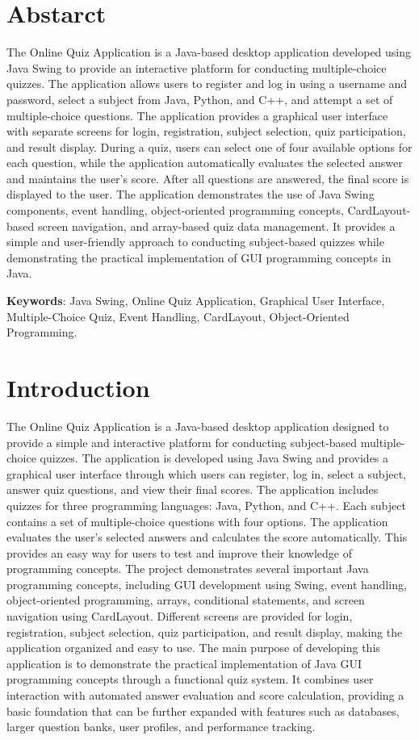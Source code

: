 \documentclass[11pt,a4paper]{report}  %
\begin{document}
\section*{Abstarct}
\noindent The Online Quiz Application is a Java-based desktop application developed using Java Swing to provide an interactive platform for conducting multiple-choice quizzes. The application allows users to register and log in using a username and password, select a subject from Java, Python, and C++, and attempt a set of multiple-choice questions.
The application provides a graphical user interface with separate screens for login, registration, subject selection, quiz participation, and result display. During a quiz, users can select one of four available options for each question, while the application automatically evaluates the selected answer and maintains the user's score. After all questions are answered, the final score is displayed to the user.
The application demonstrates the use of Java Swing components, event handling, object-oriented programming concepts, CardLayout-based screen navigation, and array-based quiz data management. It provides a simple and user-friendly approach to conducting subject-based quizzes while demonstrating the practical implementation of GUI programming concepts in Java.


\textbf{Keywords}: Java Swing, Online Quiz Application, Graphical User Interface, Multiple-Choice Quiz, Event Handling, CardLayout, Object-Oriented Programming.
\newpage
\section{Introduction}
The Online Quiz Application is a Java-based desktop application designed to provide a simple and interactive platform for conducting subject-based multiple-choice quizzes. The application is developed using Java Swing and provides a graphical user interface through which users can register, log in, select a subject, answer quiz questions, and view their final scores.
The application includes quizzes for three programming languages: Java, Python, and C++. Each subject contains a set of multiple-choice questions with four options. The application evaluates the user's selected answers and calculates the score automatically. This provides an easy way for users to test and improve their knowledge of programming concepts.
The project demonstrates several important Java programming concepts, including GUI development using Swing, event handling, object-oriented programming, arrays, conditional statements, and screen navigation using CardLayout. Different screens are provided for login, registration, subject selection, quiz participation, and result display, making the application organized and easy to use.
The main purpose of developing this application is to demonstrate the practical implementation of Java GUI programming concepts through a functional quiz system. It combines user interaction with automated answer evaluation and score calculation, providing a basic foundation that can be further expanded with features such as databases, larger question banks, user profiles, and performance tracking.
\end{document}
